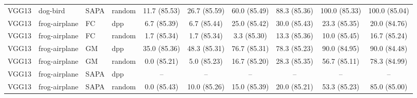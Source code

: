 \begin{table}[h]
{\begin{tabular}{llllcccccc}
VGG13 & dog-bird & SAPA & random
& 11.7 \small{(85.53)}
& 26.7 \small{(85.59)}
& 60.0 \small{(85.49)}
& 88.3 \small{(85.36)}
& 100.0 \small{(85.33)}
& 100.0 \small{(85.04)} \\ [1em]




VGG13 & frog-airplane & FC & dpp
& 6.7 \small{(85.39)}
& 6.7 \small{(85.44)}
& 25.0 \small{(85.42)}
& 30.0 \small{(85.43)}
& 23.3 \small{(85.35)}
& 20.0 \small{(84.76)} \\


VGG13 & frog-airplane & FC & random
& 1.7 \small{(85.34)}
& 1.7 \small{(85.34)}
& 3.3 \small{(85.30)}
& 13.3 \small{(85.36)}
& 10.0 \small{(85.45)}
& 16.7 \small{(85.24)} \\ [1em]


VGG13 & frog-airplane & GM & dpp
& 35.0 \small{(85.36)}
& 48.3 \small{(85.31)}
& 76.7 \small{(85.31)}
& 78.3 \small{(85.23)}
& 90.0 \small{(84.95)}
& 90.0 \small{(84.48)} \\


VGG13 & frog-airplane & GM & random
& 0.0 \small{(85.21)}
& 5.0 \small{(85.23)}
& 16.7 \small{(85.20)}
& 28.3 \small{(85.35)}
& 56.7 \small{(85.11)}
& 78.3 \small{(84.99)} \\ [1em]

VGG13 & frog-airplane & SAPA & dpp
& --
& --
& --
& --
& --
& -- \\


VGG13 & frog-airplane & SAPA & random
& 0.0 \small{(85.43)}
& 10.0 \small{(85.26)}
& 15.0 \small{(85.39)}
& 20.0 \small{(85.21)}
& 53.3 \small{(85.23)}
& 85.0 \small{(85.00)} \\ [0.1em]


\hline
\end{tabular}
}

\end{table}


